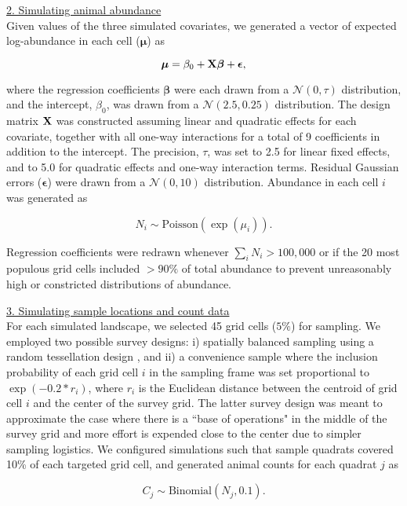 \documentclass[12pt,fleqn]{article}
\begin{document}
\begin{flushleft}
\underline{2. Simulating animal abundance} \\

Given values of the three simulated covariates, we generated a vector of expected log-abundance in each cell ($\boldsymbol{\mu}$) as
\begin{linenomath}
\begin{equation*}
  \boldsymbol{\mu} = \beta_0 + {\bf X}\boldsymbol{\beta} + \boldsymbol{\epsilon},
\end{equation*}
\end{linenomath}
where the regression coefficients $\boldsymbol{\beta}$ were each drawn from a $\mathcal{N}(0,\tau)$ distribution, and the intercept, $\beta_0$, was drawn from a $\mathcal{N}(2.5,0.25)$ distribution.  The design matrix ${\bf X}$ was constructed assuming linear and quadratic effects for each covariate, together with all one-way interactions for a total of 9 coefficients in addition to the intercept.  The precision, $\tau$, was set to 2.5 for linear fixed effects, and to 5.0 for quadratic effects and one-way interaction terms. Residual Gaussian errors ($\boldsymbol{\epsilon}$) were drawn from a $\mathcal{N}(0,10)$ distribution.
Abundance in each cell $i$ was generated as
\begin{linenomath}
\begin{equation*}
  N_i \sim \text{Poisson}(\exp(\mu_i)).
\end{equation*}
\end{linenomath}
Regression coefficients were redrawn whenever $\sum_i N_i > 100,000$ or if the 20 most populous grid cells included $>90\%$ of total abundance to prevent unreasonably high or constricted distributions of abundance.

\underline{3. Simulating sample locations and count data} \\

For each simulated landscape, we selected 45 grid cells ($5\%$) for sampling.  We employed two possible survey designs: i) spatially balanced sampling using a random tessellation design \citep{StevensOlsen2004}, and ii) a convenience sample where the inclusion probability of each grid cell $i$ in the sampling frame was set proportional to $\exp(-0.2*r_i)$, where $r_i$ is the Euclidean distance between the centroid of grid cell $i$ and the center of the survey grid.  The latter survey design was meant to approximate the case where there is a ``base of operations" in the middle of the survey grid and more effort is expended close to the center due to simpler sampling logistics.  We configured simulations such that sample quadrats covered 10\% of each targeted grid cell, and generated animal counts for each quadrat $j$ as
\begin{linenomath}
\begin{equation*}
  C_j \sim \text{Binomial}(N_j,0.1).
\end{equation*}
\end{linenomath}


\end{flushleft}
\end{document}
